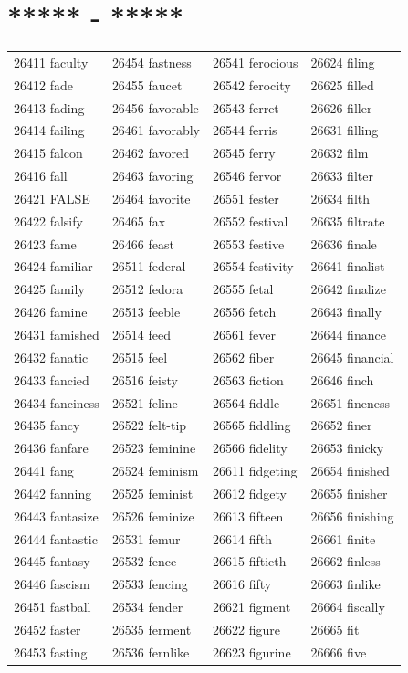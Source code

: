 \documentclass[10pt, oneside]{book}
\begin{document}
\begin{table}
	\centering
	\section*{***** - *****}
	\begin{tabular}{l l l l}
26411 faculty &26454 fastness &26541 ferocious &26624 filing\\
26412 fade &26455 faucet &26542 ferocity &26625 filled\\
26413 fading &26456 favorable &26543 ferret &26626 filler\\
26414 failing &26461 favorably &26544 ferris &26631 filling\\
26415 falcon &26462 favored &26545 ferry &26632 film\\
26416 fall &26463 favoring &26546 fervor &26633 filter\\
26421 FALSE &26464 favorite &26551 fester &26634 filth\\
26422 falsify &26465 fax &26552 festival &26635 filtrate\\
26423 fame &26466 feast &26553 festive &26636 finale\\
26424 familiar &26511 federal &26554 festivity &26641 finalist\\
26425 family &26512 fedora &26555 fetal &26642 finalize\\
26426 famine &26513 feeble &26556 fetch &26643 finally\\
26431 famished &26514 feed &26561 fever &26644 finance\\
26432 fanatic &26515 feel &26562 fiber &26645 financial\\
26433 fancied &26516 feisty &26563 fiction &26646 finch\\
26434 fanciness &26521 feline &26564 fiddle &26651 fineness\\
26435 fancy &26522 felt-tip &26565 fiddling &26652 finer\\
26436 fanfare &26523 feminine &26566 fidelity &26653 finicky\\
26441 fang &26524 feminism &26611 fidgeting &26654 finished\\
26442 fanning &26525 feminist &26612 fidgety &26655 finisher\\
26443 fantasize &26526 feminize &26613 fifteen &26656 finishing\\
26444 fantastic &26531 femur &26614 fifth &26661 finite\\
26445 fantasy &26532 fence &26615 fiftieth &26662 finless\\
26446 fascism &26533 fencing &26616 fifty &26663 finlike\\
26451 fastball &26534 fender &26621 figment &26664 fiscally\\
26452 faster &26535 ferment &26622 figure &26665 fit\\
26453 fasting &26536 fernlike &26623 figurine &26666 five\\
	\end{tabular}
 \end{table}
\end{document}
